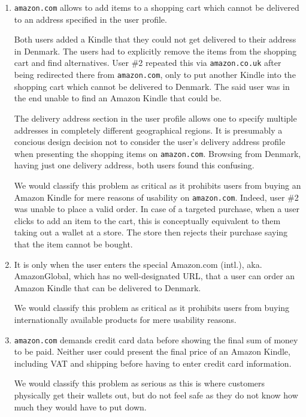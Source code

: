 \begin{enumerate}

\item \texttt{amazon.com} allows to add items to a shopping cart which cannot
be delivered to an address specified in the user profile.

Both users added a Kindle that they could not get delivered to their address in
Denmark. The users had to explicitly remove the items from the shopping cart
and find alternatives. User \#2 repeated this via \texttt{amazon.co.uk} after
being redirected there from \texttt{amazon.com}, only to put another Kindle
into the shopping cart which cannot be delivered to Denmark. The said user was
in the end unable to find an Amazon Kindle that could be.

The delivery address section in the user profile allows one to specify multiple
addresses in completely different geographical regions. It is presumably a
concious design decision not to consider the user's delivery address profile
when presenting the shopping items on \texttt{amazon.com}. Browsing from
Denmark, having just one delivery address, both users found this confusing.

We would classify this problem as critical as it prohibits users from buying an
Amazon Kindle for mere reasons of usability on \texttt{amazon.com}.  Indeed,
user \#2 was unable to place a valid order. In case of a targeted purchase,
when a user clicks to add an item to the cart, this is conceptually equivalent
to them taking out a wallet at a store. The store then rejects their purchase
saying that the item cannot be bought.

\item It is only when the user enters the special Amazon.com (intl.), aka.
AmazonGlobal, which has no well-designated URL, that a user can order an Amazon
Kindle that can be delivered to Denmark.

We would classify this problem as critical as it prohibits users from buying
internationally available products for mere usability reasons.

\item \texttt{amazon.com} demands credit card data before showing the final sum
of money to be paid. Neither user could present the final price of an Amazon
Kindle, including VAT and shipping before having to enter credit card
information.

We would classify this problem as serious as this is where customers physically
get their wallets out, but do not feel safe as they do not know how much they
would have to put down.

\end{enumerate}

